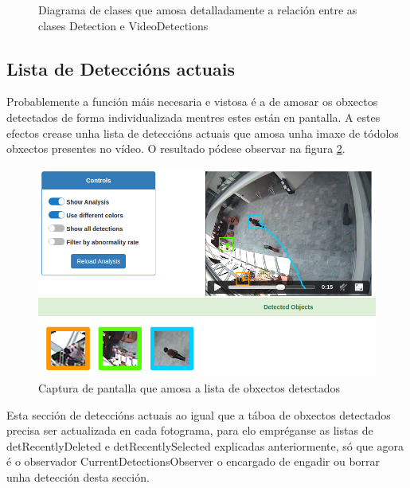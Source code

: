 \begin{figure}[htp]
\begin{center}
            \caption{Diagrama de clases que amosa detalladamente a relación entre as clases Detection
            e VideoDetections}
        \label{fig:Detection-VideoDetections}
        \end{center}
        \end{figure}
        
    \subsection{Lista de Deteccións actuais}

        Probablemente a función máis necesaria e vistosa é a de amosar os obxectos detectados de forma 
        individualizada mentres estes están en pantalla. A estes efectos crease unha lista de deteccións
        actuais que amosa unha imaxe de tódolos obxectos presentes no vídeo. O resultado pódese observar
        na figura \ref{fig:detectedObjects}.
        
        \begin{figure}[htp]
        \begin{center}
            \includegraphics[scale=0.4]{figures/detectedObjects.png}
            \caption{Captura de pantalla que amosa a lista de obxectos detectados}
        \label{fig:detectedObjects}
        \end{center}
        \end{figure}
    
        Esta sección de deteccións actuais ao igual que a táboa de obxectos detectados precisa ser 
        actualizada en cada fotograma, para elo empréganse as listas de detRecentlyDeleted e 
        detRecentlySelected explicadas anteriormente, só que agora é o observador 
        CurrentDetectionsObserver o encargado de engadir ou borrar unha detección desta sección.
        
